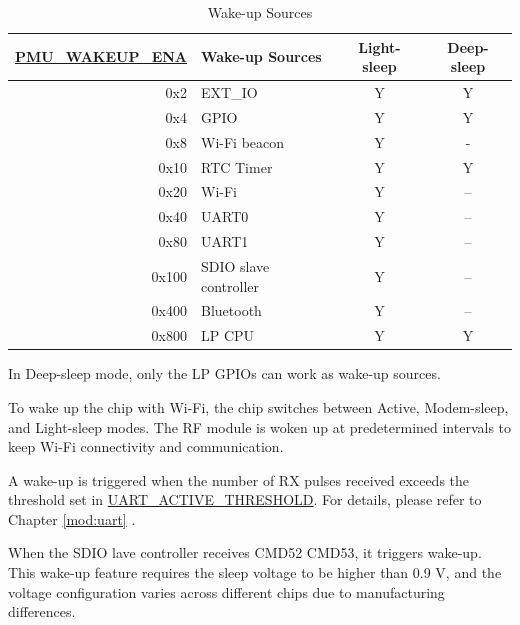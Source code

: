 \documentclass[main\_\_EN.tex]{subfiles}
\begin{document}
\begin{table}[H]
    \centering
    \caption{Wake-up Sources}
    \label{tab:lowpowm-wakeup-source}
    \begin{threeparttable}
    \begin{tabular}{| r | l | c | c |}
    \hline
    \rowcolor{lightgray}
    \textbf{\hyperref[fielddesc:PMUWAKEUPENA]{PMU\_WAKEUP\_ENA}} & \textbf{Wake-up Sources} &  \textbf{Light-sleep} & \textbf{Deep-sleep}  \\\hline
    0x2 & EXT\_IO\tnote{1} & Y & Y \\\hline
    0x4 & GPIO\tnote{1} & Y & Y \\\hline
    0x8 & Wi-Fi beacon  & Y & - \\\hline
    0x10 & RTC Timer  & Y & Y \\\hline
    0x20 & Wi-Fi\tnote{2} & Y & – \\\hline
    0x40 & UART0\tnote{3} & Y & – \\\hline
    0x80 & UART1\tnote{3} & Y & – \\\hline
    0x100 & SDIO slave controller\tnote{4} & Y & – \\\hline
    0x400 & Bluetooth & Y & – \\\hline
    0x800 & LP CPU  & Y & Y \\\hline
    \end{tabular}

\begin{tablenotes}
    \item[1] In Deep-sleep mode, only the LP GPIOs can work as wake-up sources.
    \item[2] To wake up the chip with Wi-Fi, the chip switches between Active, Modem-sleep, and Light-sleep modes. The RF module is woken up at predetermined intervals to keep Wi-Fi connectivity and communication.
    \item[3] A wake-up is triggered when the number of RX pulses received exceeds the threshold set in \hyperref[fielddesc:UARTACTIVETHRESHOLD]{UART\_ACTIVE\_THRESHOLD}. For details, please refer to Chapter \ref{mod:uart} \textit{}.
    \item[4] When the SDIO lave controller receives CMD52 CMD53, it triggers wake-up. This wake-up feature requires the sleep voltage to be higher than 0.9 V, and the voltage configuration varies across different chips due to manufacturing differences.
\end{tablenotes}
\end{threeparttable}
\end{table}
\end{document}
